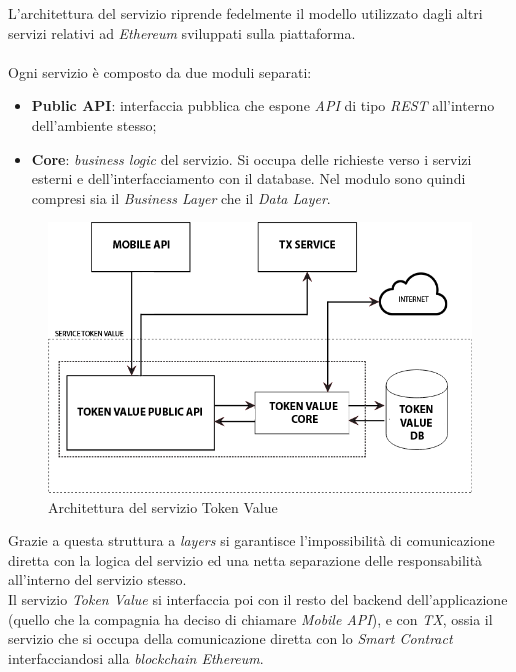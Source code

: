 \documentclass[11pt]{thesistemp}
\begin{document}
L'architettura del servizio riprende fedelmente il modello utilizzato dagli altri servizi relativi ad \textit{Ethereum} sviluppati sulla piattaforma.\\\\
Ogni servizio è composto da due moduli separati:
\begin{itemize}
	\item \textbf{Public API}: interfaccia pubblica che espone \textit{API} di tipo \textit{REST} all'interno dell'ambiente stesso;
	\item \textbf{Core}: \textit{business logic} del servizio. Si occupa delle richieste verso i servizi esterni e dell'interfacciamento con il database. Nel modulo sono quindi compresi sia il \textit{Business Layer} che il \textit{Data Layer}.
\end{itemize}
\begin{figure}[h]\hfill
    \centering
    \includegraphics[width=\textwidth]{tkvalue-arch.png}
        \caption{Architettura del servizio Token Value}
    \label{fig:tkvalue-arch}
\end{figure}
Grazie a questa struttura a \textit{layers} si garantisce l'impossibilità di comunicazione diretta con la logica del servizio ed una netta separazione delle responsabilità all'interno del servizio stesso.\\
Il servizio \textit{Token Value} si interfaccia poi con il resto del backend dell'applicazione (quello che la compagnia ha deciso di chiamare \textit{Mobile API}), e con \textit{TX}, ossia il servizio che si occupa della comunicazione diretta con lo \textit{Smart Contract} interfacciandosi alla \textit{blockchain Ethereum}.
\end{document}
